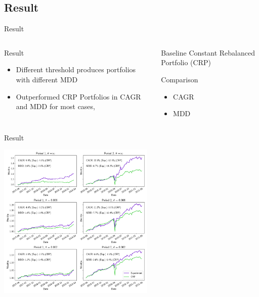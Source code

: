 \subsection{Result}
\begin{frame}{Result}

\begin{columns}[t]

\begin{column}{0.5\textwidth}
\begin{block}{Result}
\begin{itemize}
    \item Different threshold produces portfolios with different MDD
    \item Outperformed CRP Portfolios in CAGR and MDD for most cases, 
\end{itemize}
\end{block}
\end{column}

\begin{column}{0.5\textwidth}

\begin{block}{Baseline}
Constant Rebalanced Portfolio (CRP)
\end{block}


\begin{block}{Comparison}
    \begin{itemize}
        \item CAGR
        \item MDD
    \end{itemize}
\end{block}
\end{column}


\end{columns}
\end{frame}

\begin{frame}{Result}
\begin{center}
\includegraphics[height= 7.5cm]{images/crp_compare.png}
\end{center}

\end{frame}